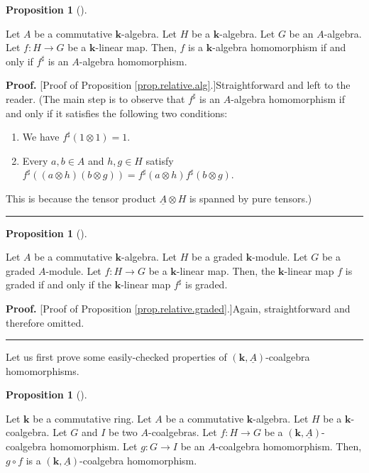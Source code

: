 \documentclass
[numbers=enddot,12pt,final,onecolumn,notitlepage,abstracton]{scrartcl}%
\theoremstyle{definition}
\newtheorem{prop}[theo]{Proposition}
\newenvironment{proposition}[1][]
{\begin{prop}[#1]\begin{leftbar}}
{\end{leftbar}\end{prop}}
\newenvironment{proof}[1][Proof]{\noindent\textbf{#1.} }{\ \rule{0.5em}{0.5em}}
\begin{document}
\begin{proposition}
\label{prop.relative.alg}Let $A$ be a commutative $\mathbf{k}$-algebra. Let
$H$ be a $\mathbf{k}$-algebra. Let $G$ be an $A$-algebra. Let $f:H\rightarrow
G$ be a $\mathbf{k}$-linear map. Then, $f$ is a $\mathbf{k}$-algebra
homomorphism if and only if $f^{\sharp}$ is an $A$-algebra homomorphism.
\end{proposition}

\begin{proof}
[Proof of Proposition \ref{prop.relative.alg}.]Straightforward and left to the
reader. (The main step is to observe that $f^{\sharp}$ is an $A$-algebra
homomorphism if and only if it satisfies the following two conditions:

\begin{enumerate}
\item We have $f^{\sharp}\left(  1\otimes1\right)  =1$.

\item Every $a,b\in A$ and $h,g\in H$ satisfy $f^{\sharp}\left(  \left(
a\otimes h\right)  \left(  b\otimes g\right)  \right)  =f^{\sharp}\left(
a\otimes h\right)  f^{\sharp}\left(  b\otimes g\right)  $.
\end{enumerate}

\noindent This is because the tensor product $\underline{A}\otimes H$ is
spanned by pure tensors.)
\end{proof}

\begin{proposition}
\label{prop.relative.graded}Let $A$ be a commutative $\mathbf{k}$-algebra. Let
$H$ be a graded $\mathbf{k}$-module. Let $G$ be a graded $A$-module. Let
$f:H\rightarrow G$ be a $\mathbf{k}$-linear map. Then, the $\mathbf{k}$-linear
map $f$ is graded if and only if the $\mathbf{k}$-linear map $f^{\sharp}$ is graded.
\end{proposition}

\begin{proof}
[Proof of Proposition \ref{prop.relative.graded}.]Again, straightforward and
therefore omitted.
\end{proof}

Let us first prove some easily-checked properties of $\left(  \mathbf{k}%
,\underline{A}\right)  $-coalgebra homomorphisms.

\begin{proposition}
\label{prop.relative.composition.a}Let $\mathbf{k}$ be a commutative ring. Let
$A$ be a commutative $\mathbf{k}$-algebra. Let $H$ be a $\mathbf{k}%
$-coalgebra. Let $G$ and $I$ be two $A$-coalgebras. Let $f:H\rightarrow G$ be
a $\left(  \mathbf{k},\underline{A}\right)  $-coalgebra homomorphism. Let
$g:G\rightarrow I$ be an $A$-coalgebra homomorphism. Then, $g\circ f$ is a
$\left(  \mathbf{k},\underline{A}\right)  $-coalgebra homomorphism.
\end{proposition}
\end{document}
